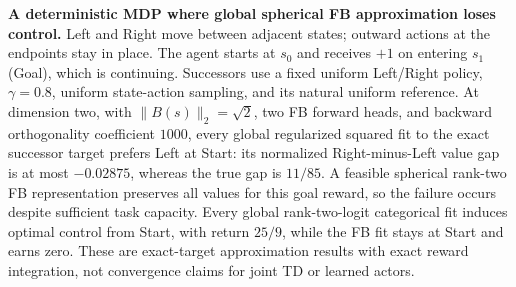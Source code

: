 \caption{\textbf{A deterministic MDP where global spherical FB approximation loses control.}
Left and Right move between adjacent states; outward actions at the endpoints
stay in place. The agent starts at $s_0$ and receives $+1$ on entering $s_1$
(Goal), which is continuing. Successors use a fixed uniform Left/Right policy,
$\gamma=0.8$, uniform state-action sampling, and its natural uniform reference.
At dimension two, with $\|B(s)\|_2=\sqrt2$, two FB forward heads, and backward
orthogonality coefficient $1000$, every global regularized squared fit to the
exact successor target prefers Left at Start: its normalized Right-minus-Left
value gap is at most $-0.02875$, whereas the true gap is $11/85$.
A feasible spherical rank-two FB representation preserves all values for this
goal reward, so the failure occurs despite sufficient task capacity.
Every global rank-two-logit categorical fit induces optimal control from Start,
with return $25/9$, while the FB fit stays at Start and earns zero.
These are exact-target approximation results with exact reward integration,
not convergence claims for joint TD or learned actors.}
\label{fig:deterministic-path-spherical}

